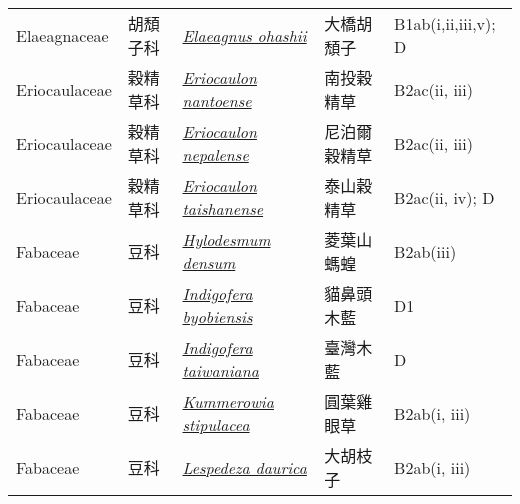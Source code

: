{\begin{longtable}{L{2.5cm}L{2cm}L{5cm}L{2.5cm}L{3cm}}
    Elaeagnaceae & 胡頹子科 & \href{http://www.theplantlist.org/tpl1.1/search?q=Elaeagnus+ohashii}{\textit{Elaeagnus ohashii} } & 大橋胡頹子 & B1ab(i,ii,iii,v); D    \\
    Eriocaulaceae & 穀精草科 & \href{http://www.theplantlist.org/tpl1.1/search?q=Eriocaulon+nantoense}{\textit{Eriocaulon nantoense} } & 南投穀精草 & B2ac(ii, iii)    \\
    Eriocaulaceae & 穀精草科 & \href{http://www.theplantlist.org/tpl1.1/search?q=Eriocaulon+nepalense}{\textit{Eriocaulon nepalense} } & 尼泊爾穀精草 & B2ac(ii, iii)    \\
    Eriocaulaceae & 穀精草科 & \href{http://www.theplantlist.org/tpl1.1/search?q=Eriocaulon+taishanense}{\textit{Eriocaulon taishanense} } & 泰山穀精草 & B2ac(ii, iv); D    \\
    Fabaceae & 豆科 & \href{http://www.theplantlist.org/tpl1.1/search?q=Hylodesmum+densum}{\textit{Hylodesmum densum} } & 菱葉山螞蝗 & B2ab(iii)    \\
    Fabaceae & 豆科 & \href{http://www.theplantlist.org/tpl1.1/search?q=Indigofera+byobiensis}{\textit{Indigofera byobiensis} } & 貓鼻頭木藍 & D1    \\
    Fabaceae & 豆科 & \href{http://www.theplantlist.org/tpl1.1/search?q=Indigofera+taiwaniana}{\textit{Indigofera taiwaniana} } & 臺灣木藍 & D    \\
    Fabaceae & 豆科 & \href{http://www.theplantlist.org/tpl1.1/search?q=Kummerowia+stipulacea}{\textit{Kummerowia stipulacea} } & 圓葉雞眼草 & B2ab(i, iii)    \\
    Fabaceae & 豆科 & \href{http://www.theplantlist.org/tpl1.1/search?q=Lespedeza+daurica}{\textit{Lespedeza daurica} } & 大胡枝子 & B2ab(i, iii)    \\

\end{longtable}}
